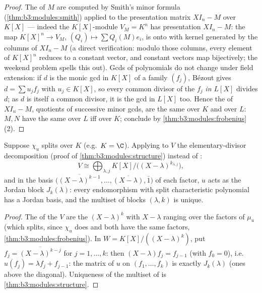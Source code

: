 \begin{proof}
The  of $M$ are computed by Smith's minor
formula (\cref{thm:b3:modules:smith}) applied to the presentation
matrix $XI_n - M$ over $K[X]$ --- indeed the $K[X]$-module
$V_M = K^n$ has presentation $XI_n - M$: the map $K[X]^n \to V_M$,
$(Q_i) \mapsto \sum Q_i(M)e_i$, is onto with kernel generated by
the columns of $XI_n - M$ (a direct verification: modulo those
columns, every element of $K[X]^n$ reduces to a constant vector,
and constant vectors map bijectively; the weekend problem spells
this out). Gcds of polynomials do not change under field
extension: if $d$ is the monic gcd in $K[X]$ of a family $(f_j)$,
B\'ezout gives $d = \sum u_jf_j$ with $u_j \in K[X]$, so every
common divisor of the $f_j$ \emph{in $L[X]$} divides $d$; as $d$
is itself a common divisor, it is the gcd in $L[X]$ too. Hence
the  of $XI_n - M$, quotients of successive
minor gcds, are the same over $K$ and over $L$: $M, N$ have the
same  over $L$ iff over $K$; conclude by
\cref{thm:b3:modules:frobenius}(2).
\end{proof}

\begin{theorem}\label{thm:b3:modules:jordan}
Suppose $\chi_u$ splits over $K$ (e.g.\ $K = \C$). Applying to
$V$ the elementary-divisor decomposition (proof of
\cref{thm:b3:modules:structure}) instead of :
\[
V \cong \bigoplus_{\lambda, j} K[X]\big/\bigl((X -
\lambda)^{k_{\lambda,j}}\bigr),
\]
and in the basis $\bigl(\overline{(X-\lambda)^{k-1}}, \dots,
\overline{(X - \lambda)}, \bar 1\bigr)$ of each factor, $u$ acts
as the Jordan block $J_k(\lambda)$: every endomorphism with split
characteristic polynomial has a Jordan basis, and the multiset of
blocks $(\lambda, k)$ is unique.
\end{theorem}

\begin{proof}
The  of the  $V$ are the
$(X - \lambda)^k$ with $X - \lambda$ ranging over the 
factors of $\mu_u$ (which splits, since $\chi_u$ does and both
have the same  factors,
\cref{thm:b3:modules:frobenius}). In $W = K[X]/((X-\lambda)^k)$,
put $f_j = \overline{(X - \lambda)^{k-j}}$ for $j = 1, \dots, k$:
then $(X - \lambda)f_j = f_{j-1}$ (with $f_0 = 0$), i.e.\ $u(f_j)
= \lambda f_j + f_{j-1}$: the matrix of $u$ on $(f_1, \dots,
f_k)$ is exactly $J_k(\lambda)$ (ones above the diagonal).
Uniqueness of the multiset of  is
\cref{thm:b3:modules:structure}.
\end{proof}

